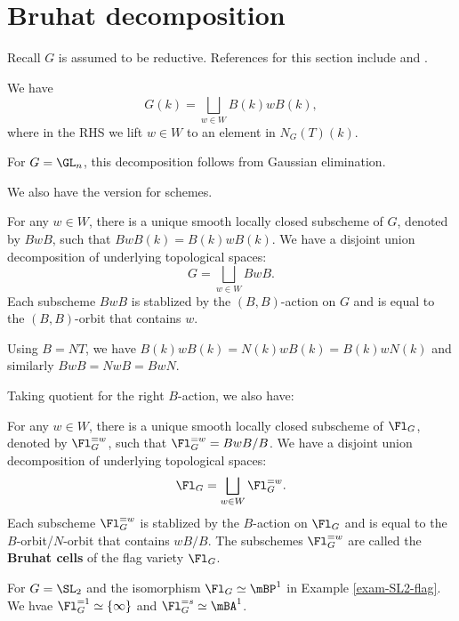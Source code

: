 \section{Bruhat decomposition}

	Recall $G$ is assumed to be reductive. References for this section include \cite[Section 21.h]{M} and \cite[Chapter 13]{J}. 

	\begin{thm}
		We have
		\[
			G(k) = \bigsqcup_{w\in W} B(k)wB(k),
		\]
		where in the RHS we lift $w\in W$ to an element in $N_G(T)(k)$.
	\end{thm}

	

	\begin{exam}
		For $G=\GL_n$, this decomposition follows from Gaussian elimination.
	\end{exam}

	We also have the version for schemes. 

	\begin{thm}
		For any $w\in W$, there is a unique smooth locally closed subscheme of $G$, denoted by $BwB$, such that $BwB(k)=B(k)wB(k)$. We have a disjoint union decomposition of underlying topological spaces:
		\[
			G = \bigsqcup_{w\in W} BwB.
		\]
		Each subscheme $BwB$ is stablized by the $(B,B)$-action on $G$ and is equal to the $(B,B)$-orbit that contains $w$.
	\end{thm}

	\begin{rem}
		Using $B=NT$, we have $B(k)wB(k) = N(k)wB(k) = B(k)wN(k)$ and similarly $BwB = NwB = BwN$.
	\end{rem}

	Taking quotient for the right $B$-action, we also have:

	\begin{thmdefn}
		For any $w\in W$, there is a unique smooth locally closed subscheme of $\Fl_G$, denoted by $\Fl_G^{=w}$, such that $\Fl_G^{=w}=BwB/B$. We have a disjoint union decomposition of underlying topological spaces:
		\[
			\Fl_G = \bigsqcup_{w\in W} \Fl_G^{=w}.
		\]
		Each subscheme $\Fl_G^{=w}$ is stablized by the $B$-action on $\Fl_G$ and is equal to the $B$-orbit/$N$-orbit that contains $wB/B$. The subschemes $\Fl_G^{=w}$ are called the \textbf{Bruhat cells} of the flag variety $\Fl_G$.
	\end{thmdefn}

	\begin{exam}
		For $G=\SL_2$ and the isomorphism $\Fl_G\simeq \mBP^1$ in Example \ref{exam-SL2-flag}. We hvae $\Fl_G^{=1} \simeq \{\infty\}$ and $\Fl_G^{=s} \simeq  \mBA^1$.
	\end{exam}

